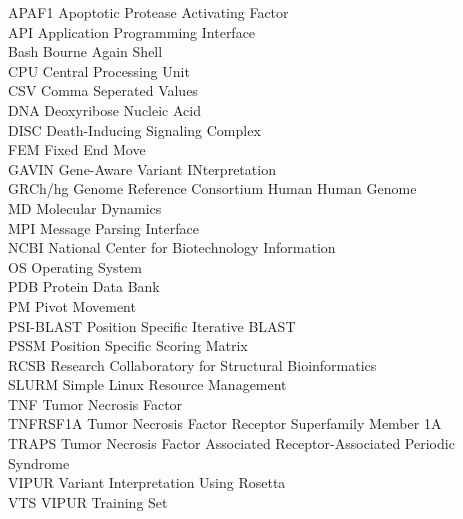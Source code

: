 APAF1 Apoptotic Protease Activating Factor\\
API Application Programming Interface\\
Bash Bourne Again Shell\\
CPU Central Processing Unit\\
CSV Comma Seperated Values\\
DNA Deoxyribose Nucleic Acid\\
DISC Death-Inducing Signaling Complex\\
FEM Fixed End Move\\
GAVIN Gene-Aware Variant INterpretation\\
GRCh/hg Genome Reference Consortium Human Human Genome\\
MD	Molecular Dynamics\\
MPI Message Parsing Interface\\
NCBI National Center for Biotechnology Information\\
OS Operating System\\
PDB Protein Data Bank\\
PM Pivot Movement\\
PSI-BLAST Position Specific Iterative BLAST\\
PSSM Position Specific Scoring Matrix\\
RCSB Research Collaboratory for Structural Bioinformatics\\
SLURM Simple Linux Resource Management\\
TNF Tumor Necrosis Factor\\
TNFRSF1A Tumor Necrosis Factor Receptor Superfamily Member 1A\\
TRAPS Tumor Necrosis Factor Associated Receptor-Associated Periodic Syndrome\\
VIPUR Variant Interpretation Using Rosetta\\
VTS VIPUR Training Set\\